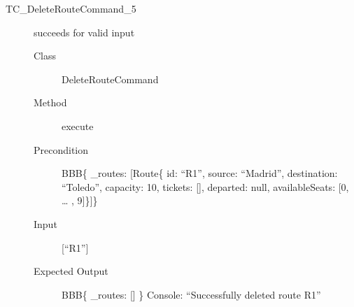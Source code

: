 \documentclass[11pt]{article}
\begin{document}
\begin{description}
\item[{TC\_DeleteRouteCommand\_5}] succeeds for valid input
\begin{description}
\item[{Class}] DeleteRouteCommand
\item[{Method}] execute
\item[{Precondition}] BBB\{ \_routes: [Route\{ id: “R1”, source: “Madrid”, destination: “Toledo”, capacity: 10,  tickets: [], departed: null, availableSeats: [0, … , 9]\}]\}
\item[{Input}] [“R1”]
\item[{Expected Output}] BBB\{ \_routes: [] \}
Console: “Successfully deleted route R1”
\end{description}
\end{description}
\end{document}
